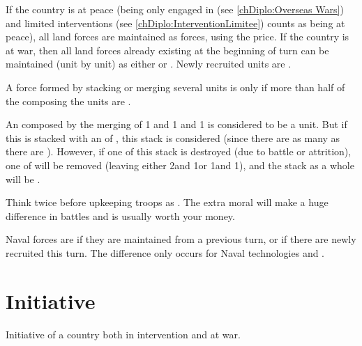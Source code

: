  If the country is at peace (being only engaged in
 (see \ref{chDiplo:Overseas Wars}) and limited
interventions (see \ref{chDiplo:InterventionLimitee}) counts as being at
peace), all land forces are maintained as  forces, using the
 price.
\bparag If the country is at war, then all land forces already existing at the
beginning of turn can be maintained (unit by unit) as either 
or . Newly recruited units are .

 A force formed by stacking or merging several units is
 only if more than half of the \LD composing the units are
.

\begin{exemple}
  An \ARMY\faceplus composed by the merging of 1  \LD and 1
   \ARMY\facemoins and 1  \LD is considered to
  be a  unit. But if this \ARMY\faceplus is stacked with an
  \ARMY\facemoins of , this stack is considered
   (since there are as many  as there are
  ). However, if one \LD of this stack is destroyed (due to
  battle or attrition), one \LD of  will be removed (leaving
  either 2\ARMY\facemoins and 1\LD or 1\ARMY\faceplus and 1\LD), and the stack
  as a whole will be .
\end{exemple}

\begin{playtip}
  Think twice before upkeeping troops as . The extra moral
  will make a huge difference in battles and is usually worth your money.
\end{playtip}

\aparag[Navy] Naval forces are  if they are maintained from a
previous turn, or  if there are newly recruited this turn.
\bparag The difference only occurs for Naval technologies  and
.%


\section{Initiative}
Initiative of a country both in intervention and at war.

